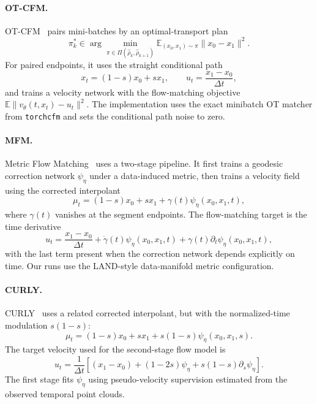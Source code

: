 \paragraph{OT-CFM.}
OT-CFM~\citep{tong2023conditional} pairs mini-batches by an optimal-transport plan
\begin{equation}
  \pi_k^*\in\arg\min_{\pi\in\Pi(\hat\rho_k,\hat\rho_{k+1})}
  \mathbb{E}_{(x_0,x_1)\sim\pi}\|x_0-x_1\|^2.
\end{equation}
For paired endpoints, it uses the straight conditional path
\begin{equation}
  x_t=(1-s)x_0+s x_1,
  \qquad
  u_t=\frac{x_1-x_0}{\Delta t},
\end{equation}
and trains a velocity network with the flow-matching objective $\mathbb{E}\|v_\theta(t,x_t)-u_t\|^2$. The implementation uses the exact minibatch OT matcher from \texttt{torchcfm} and sets the conditional path noise to zero.

\paragraph{MFM.}
Metric Flow Matching~\citep{kapusniak2024metric} uses a two-stage pipeline. It first trains a geodesic correction network $\psi_\eta$ under a data-induced metric, then trains a velocity field using the corrected interpolant
\begin{equation}
  \mu_t=(1-s)x_0+s x_1+\gamma(t)\psi_\eta(x_0,x_1,t),
\end{equation}
where $\gamma(t)$ vanishes at the segment endpoints. The flow-matching target is the time derivative
\begin{equation}
  u_t=\frac{x_1-x_0}{\Delta t}+\dot{\gamma}(t)\psi_\eta(x_0,x_1,t)
  +\gamma(t)\partial_t\psi_\eta(x_0,x_1,t),
\end{equation}
with the last term present when the correction network depends explicitly on time. Our runs use the LAND-style data-manifold metric configuration.

\paragraph{CURLY.}
CURLY~\citep{petrovic2026curly} uses a related corrected interpolant, but with the normalized-time modulation $s(1-s)$:
\begin{equation}
  \mu_t=(1-s)x_0+s x_1+s(1-s)\psi_\eta(x_0,x_1,s).
\end{equation}
The target velocity used for the second-stage flow model is
\begin{equation}
  u_t=\frac{1}{\Delta t}\left[(x_1-x_0)+(1-2s)\psi_\eta
  +s(1-s)\partial_s\psi_\eta\right].
\end{equation}
The first stage fits $\psi_\eta$ using pseudo-velocity supervision estimated from the observed temporal point clouds.

